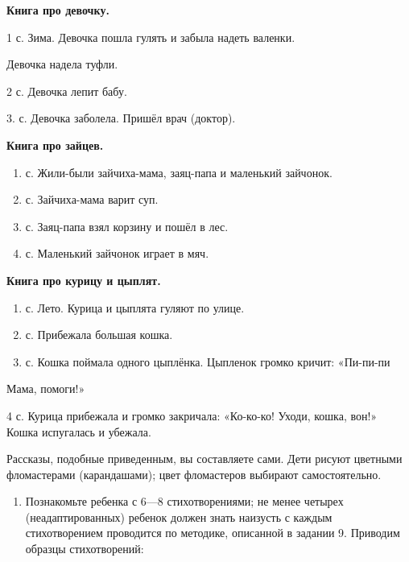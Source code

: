 \documentclass{book}
\begin{document}
\textbf{Книга про девочку.}

1 с. Зима. Девочка пошла гулять и забыла надеть валенки.

Девочка надела туфли.

2 с. Девочка лепит бабу.

3. с. Девочка заболела. Пришёл врач (доктор).

\textbf{Книга про зайцев.}


\begin{enumerate}
\def\labelenumi{\arabic{enumi}.}
\item
  
  с. Жили-были зайчиха-мама, заяц-папа и маленький зайчонок.
  
\item
  
  с. Зайчиха-мама варит суп.
  
\item
  
  с. Заяц-папа взял корзину и пошёл в лес.
  
\item
  
  с. Маленький зайчонок играет в мяч.
  
\end{enumerate}


\textbf{Книга про курицу и цыплят.}


\begin{enumerate}
\def\labelenumi{\arabic{enumi}.}
\item
  
  с. Лето. Курица и цыплята гуляют по улице.
  
\item
  
  с. Прибежала большая кошка.
  
\item
  
  с. Кошка поймала одного цыплёнка. Цыпленок громко кричит: «Пи-пи-пи
  
\end{enumerate}


Мама, помоги!»

4 с. Курица прибежала и громко закричала: «Ко-ко-ко! Уходи, кошка, вон!»
Кошка испугалась и убежала.

Рассказы, подобные приведенным, вы составляете сами. Дети рисуют
цветными фломастерами (карандашами); цвет фломастеров выбирают
самостоятельно.


\begin{enumerate}
\def\labelenumi{\arabic{enumi}.}
\setcounter{enumi}{7}
\item
  
  Познакомьте ребенка с 6---8 стихотворениями; не менее четырех
  (неадаптированных) ребенок должен знать наизусть с каждым
  стихотворением проводится по методике, описанной в задании 9. Приводим
  образцы стихотворений:
  
\end{enumerate}
\end{document}
